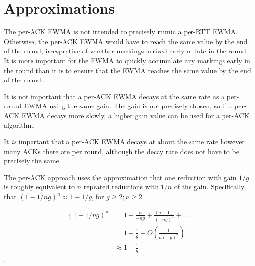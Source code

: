 \section{Approximations}\label{prresp_approx}

The per-ACK EWMA is not intended to precisely mimic a per-RTT EWMA. Otherwise, the per-ACK EWMA would have to reach the same value by the end of the round, irrespective of whether markings arrived early or late in the round.
It is more important for the EWMA to quickly accumulate any markings early in the round than it is to ensure that the EWMA reaches the same value by the end of the round. 

It is not important that a per-ACK EWMA decays at the same rate as a per-round EWMA using the same gain. The gain is not precisely chosen, so if a per-ACK EWMA decays more slowly, a higher gain value can be used for a per-ACK algorithm.

It \emph{is} important that a per-ACK EWMA decays at about the same rate however many ACKs there are per round, although the decay rate does not have to be precisely the same.

The per-ACK approach uses the approximation that one reduction with gain \(1/g\) is roughly equivalent to \(n\) repeated reductions with \(1/n\) of the gain. Specifically, that \((1 - 1/ng)^n \approx 1 - 1/g\), for \(g\ge2; n\ge2\).

\begin{align*}
(1 - 1/ng)^n &=       1 + \frac{n}{-ng} + \frac{(n-1)}{(-ng)^2} + \ldots \\
             &=       1 - \frac{1}{g} + O\left(\frac{1}{n(-g)^2}\right)\\
             &\approx 1 - \frac{1}{g}
\end{align*}
.
